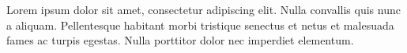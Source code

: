 \documentclass{book}
\begin{document}
Lorem ipsum dolor sit amet, consectetur adipiscing elit. 
Nulla convallis quis nunc a aliquam. Pellentesque habitant 
morbi tristique senectus et netus et malesuada fames ac 
turpis egestas. Nulla porttitor dolor nec imperdiet elementum. 
\end{document}
